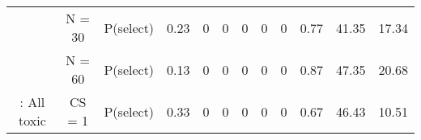 \begin{table}
\begin{singlespace}
{\begin{tabular}[t]{cccccccccccc}
			& N = 30 & P(select) & 0.23 & 0 & 0 & 0 & 0 & 0 & 0.77 & 41.35 & 17.34\\
			
			& N = 60 & P(select) & 0.13 & 0 & 0 & 0 & 0 & 0 & 0.87 & 47.35 & 20.68\\
			
			\multirow{-7}{*}{\centering\arraybackslash 8: All toxic} & CS = 1 & P(select) & 0.33 & 0 & 0 & 0 & 0 & 0 & 0.67 & 46.43 & 10.51\\
			\bottomrule
		\end{tabular}}
	\end{singlespace}
\end{table}

\begin{table} %
	
	\caption[Alternative designs selection probabilities for ordering 2.]{\label{tab_adept:Design_Comparison2}Selection probabilities of the TD25 and expected trial duration (in months) for the PO-TITE, TITE and PO-CRM designs as well as modified PO-TITE-CRM designs for scenarios 9-16 (where 2a is considered more toxic than 2b) based on 10000 simulated trials.}
	
	\centering
	\begin{singlespace}
\end{singlespace}
\end{table}
